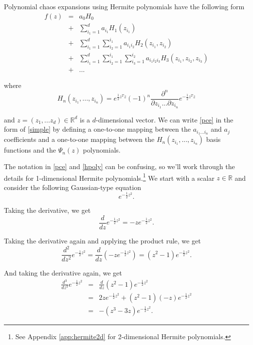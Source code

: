 \documentclass[11pt]{article}
\numberwithin{equation}{section}
\begin{document}
\qquad Polynomial chaos expansions using Hermite polynomials have the following form
\begin{eqnarray}
f(z) & = & a_0 H_0 \nonumber \\
& + & \sum_{i_1 = 1}^{d} a_{i_1} H_1(z_{i_1}) \nonumber \\
& + & \sum_{i_1 = 1}^{d} \sum_{i_2 = 1}^{i_1} a_{i_1 i_2} H_2(z_{i_1}, z_{i_2}) \nonumber \\
& + & \sum_{i_1 = 1}^{d} \sum_{i_2 = 1}^{i_1} \sum_{i_3 = 1}^{i_2} a_{i_1 i_2 i_3} H_3(z_{i_1}, z_{i_2}, z_{i_3}) \nonumber \\
& + & ... \label{pce}
\end{eqnarray}

where
\begin{equation}
H_n(z_{i_1}, ..., z_{i_n}) = e^{\frac{1}{2} z^T z} (-1)^n \frac{\partial^n}{\partial z_{i_1} ... \partial z_{i_n}} e^{-\frac{1}{2} z^T z} \label{hpoly}
\end{equation}

and $z = (z_1, ... z_d) \in \mathbb{R}^d$ is a $d$-dimensional vector.  We can write \eqref{pce} in the form of \eqref{simple} by defining a one-to-one mapping between the $a_{i_1 ... i_n}$ and $a_j$ coefficients and a one-to-one mapping between the $H_n(z_{i_1}, ..., z_{i_n})$ basis functions and the $\Psi_n(z)$ polynomials.

\qquad The notation in \eqref{pce} and \eqref{hpoly} can be confusing, so we'll work through the details for 1-dimensional Hermite polynomials.\footnote{See Appendix \ref{app:hermite2d} for 2-dimensional Hermite polynomials.} We start with a scalar $z \in \mathbb{R}$ and consider the following Gaussian-type equation
\begin{equation}
e^{-\frac{1}{2} z^2}. \label{gaussian_exp}
\end{equation}

Taking the derivative, we get
\begin{equation*}
\frac{d}{dz} e^{-\frac{1}{2} z^2} = -z e^{-\frac{1}{2} z^2}.
\end{equation*}

Taking the derivative again and applying the product rule, we get 
\begin{equation*}
\frac{d^2}{dz^2} e^{-\frac{1}{2} z^2} = \frac{d}{dz} \left( -z e^{-\frac{1}{2} z^2} \right) = \left( z^2 - 1 \right) e^{-\frac{1}{2} z^2}.
\end{equation*}

And taking the derivative again, we get 
\begin{eqnarray*}
\frac{d^3}{dz^3} e^{-\frac{1}{2} z^2} & = & \frac{d}{dz} \left( z^2 - 1 \right) e^{-\frac{1}{2} z^2} \nonumber \\
& = & 2 z e^{-\frac{1}{2} z^2} + (z^2 - 1) (-z) e^{-\frac{1}{2} z^2} \nonumber \\
& = & -( z^3 - 3 z) e^{-\frac{1}{2} z^2}.
\end{eqnarray*}
\end{document}
